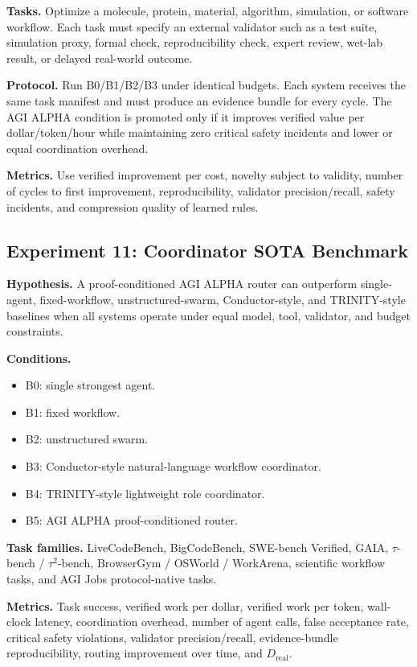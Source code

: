 \documentclass[
  11pt,
]{article}
\providecommand{\tightlist}{%
  \setlength{\itemsep}{0pt}\setlength{\parskip}{0pt}}
\begin{document}
\textbf{Tasks.} Optimize a molecule, protein, material, algorithm,
simulation, or software workflow. Each task must specify an external
validator such as a test suite, simulation proxy, formal check,
reproducibility check, expert review, wet-lab result, or delayed
real-world outcome.

\textbf{Protocol.} Run B0/B1/B2/B3 under identical budgets. Each system
receives the same task manifest and must produce an evidence bundle for
every cycle. The AGI ALPHA condition is promoted only if it improves
verified value per dollar/token/hour while maintaining zero critical
safety incidents and lower or equal coordination overhead.

\textbf{Metrics.} Use verified improvement per cost, novelty subject to
validity, number of cycles to first improvement, reproducibility,
validator precision/recall, safety incidents, and compression quality of
learned rules.

\subsection{Experiment 11: Coordinator SOTA
Benchmark}\label{experiment-11-coordinator-sota-benchmark}

\textbf{Hypothesis.} A proof-conditioned AGI ALPHA router can outperform
single-agent, fixed-workflow, unstructured-swarm, Conductor-style, and
TRINITY-style baselines when all systems operate under equal model,
tool, validator, and budget constraints.

\textbf{Conditions.}

\begin{itemize}
\tightlist
\item
  B0: single strongest agent.
\item
  B1: fixed workflow.
\item
  B2: unstructured swarm.
\item
  B3: Conductor-style natural-language workflow coordinator.
\item
  B4: TRINITY-style lightweight role coordinator.
\item
  B5: AGI ALPHA proof-conditioned router.
\end{itemize}

\textbf{Task families.} LiveCodeBench, BigCodeBench, SWE-bench Verified,
GAIA, \(\tau\)-bench / \(\tau^2\)-bench, BrowserGym / OSWorld /
WorkArena, scientific workflow tasks, and AGI Jobs protocol-native
tasks.

\textbf{Metrics.} Task success, verified work per dollar, verified work
per token, wall-clock latency, coordination overhead, number of agent
calls, false acceptance rate, critical safety violations, validator
precision/recall, evidence-bundle reproducibility, routing improvement
over time, and \(D_{\mathrm{real}}\).
\end{document}
